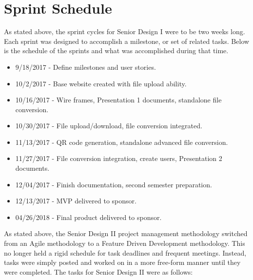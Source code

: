
\section{Sprint Schedule}
As stated above, the sprint cycles for Senior Design I were to be two weeks long. Each sprint was designed to accomplish a milestone, or set of related tasks. Below is the schedule of the sprints and what was accomplished during that time.

\begin{itemize}
	\item 9/18/2017   - Define milestones and user stories.
	\item 10/2/2017   - Base website created with file upload ability.
	\item 10/16/2017  - Wire frames, Presentation 1 documents, standalone file conversion.
	\item 10/30/2017  - File upload/download, file conversion integrated.
	\item 11/13/2017  - QR code generation, standalone advanced file conversion.
	\item 11/27/2017  - File conversion integration, create users, Presentation 2 documents.
	\item 12/04/2017  - Finish documentation, second semester preparation.
	\item 12/13/2017  - MVP delivered to sponsor.
	\item 04/26/2018  - Final product delivered to sponsor.
\end{itemize}

As stated above, the Senior Design II project management methodology switched from an Agile methodology to a Feature Driven Development methodology.  
This no longer held a rigid schedule for task deadlines and frequent meetings.
Instead, tasks were simply posted and worked on in a more free-form manner until they were completed. 
The tasks for Senior Design II were as follows:

